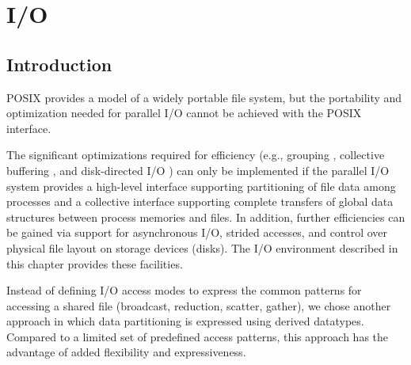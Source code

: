 

\chapter{I/O}
\label{chap:io-2}
\label{sec:io-2}

\section{Introduction}
\label{sec:io-intro}

POSIX provides a model of a widely portable file system,
but the portability and optimization needed for parallel I/O
cannot be achieved with
the POSIX interface.

The significant optimizations required for efficiency
(e.g., grouping \cite{nitzberg:cfs},
collective buffering
\cite{bordawekar:primitives,delrosario:two-phase,nitzberg:thesis,seamons:panda,thakur:jext2phase},
and disk-directed I/O \cite{kotz:diskdir})
can only be implemented
if the parallel I/O system provides a high-level interface supporting
partitioning of file data among processes
and a collective interface
supporting
complete transfers of global data structures between process
memories and files.
In addition, further efficiencies can be gained via support
for asynchronous I/O, strided accesses,
and control over physical file layout on storage devices (disks).
The I/O environment described in this chapter provides these facilities.

Instead of defining
I/O
access modes to express the common patterns
for accessing a shared file (broadcast, reduction, scatter, gather),
we chose another approach
in which data partitioning is expressed using
derived datatypes.
Compared to a limited set of predefined access patterns, 
this approach has the advantage of added flexibility and expressiveness.

